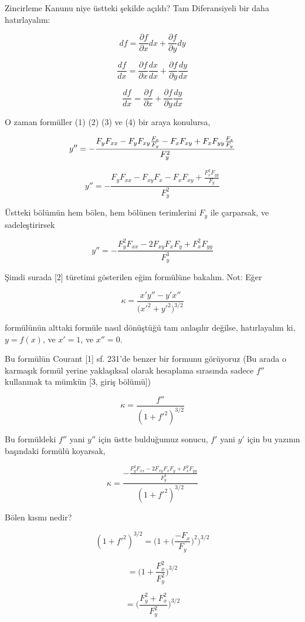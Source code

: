 \documentclass[12pt,fleqn]{article}\usepackage{../../common}
\begin{document}
Zincirleme Kanunu niye üstteki şekilde açıldı? Tam Diferansiyeli bir daha
hatırlayalım:

$$ df = \frac{\partial f}{\partial x} dx + \frac{\partial f}{\partial y} dy  $$

$$ \frac{df}{dx} = \frac{\partial f}{\partial x} \frac{dx}{dx} + \frac{\partial f}{\partial y} \frac{dy}{dx}  $$

$$ \frac{df}{dx} = \frac{\partial f}{\partial x} + \frac{\partial f}{\partial y} \frac{dy}{dx}  $$

O zaman formüller (1) (2) (3) ve (4) bir araya konulursa,

$$ y '' = - \frac{F_yF_{xx} - F_y F_{xy}\frac{F_x}{F_y} - F_xF_{xy} + F_xF_{yy}\frac{F_x}{F_y}}{F_y^2}\\ $$

$$ y '' = - \frac{F_yF_{xx} - F_{xy}F_x - F_xF_{xy} + \frac{F_x^2F_{yy}}{F_y}}{F_y^2} $$

Üstteki bölümün hem bölen, hem bölünen terimlerini $F_y$ ile çarparsak, ve
sadeleştirirsek

$$ y '' = - \frac{F_y^2F_{xx} - 2F_{xy}F_xF_y + F_x^2F_{yy}}{F_y^3} $$

Şimdi surada [2] türetimi gösterilen eğim  formülüne
bakalım. Not: Eğer

$$ \kappa = \frac{x'y''-y'x''}{\bigg(x'^2 + y'^2 \bigg)^{3/2}} $$

formülünün alttaki formüle nasıl dönüştüğü tam anlaşılır değilse,
hatırlayalım ki, $y=f(x)$, ve $x'=1$, ve $x'' = 0$.

Bu formülün Courant [1] sf. 231'de benzer bir formunu görüyoruz (Bu arada o
karmaşık formül yerine yaklaşıksal olarak hesaplama sırasında sadece $f''$
kullanmak ta mümkün [3, giriş bölümü])

$$ \kappa = \frac{f''}{(1+f'^2)^{3/2}} $$

Bu formüldeki $f''$ yani $y''$ için üstte bulduğumuz sonucu, $f'$ yani $y'$
için bu yazının başındaki formülü koyarsak,

$$ 
\kappa = \frac
{-\frac
{\displaystyle F_y^2F_{xx} - 2F_{xy}F_xF_y +  F_x^2F_{yy}}{\displaystyle F_y^3}}
{(1+f'^2)^{3/2}} 
$$  

Bölen kısmı nedir?

$$ (1+f'^2)^{3/2} = \bigg( 1 + \bigg(\frac{-F_x}{F_y}\bigg)^2 \bigg)^{3/2}  $$

$$ = \bigg( 1 + \frac{F_x^2}{F_y^2} \bigg)^{3/2}  $$

$$ = \bigg( \frac{F_y^2 + F_x^2}{F_y^2} \bigg)^{3/2}  $$
\end{document}
